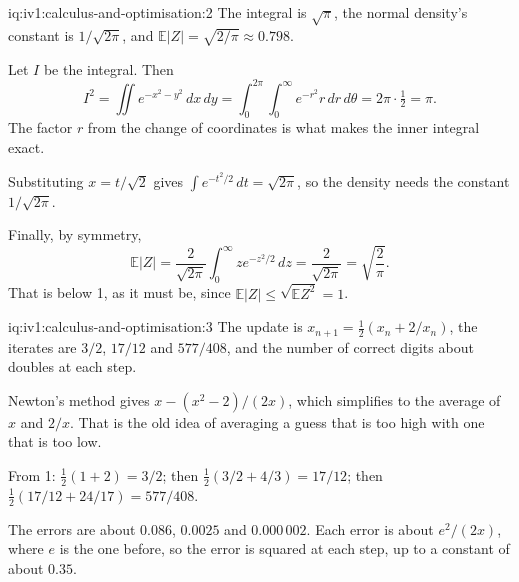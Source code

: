\begin{solution}{iq:iv1:calculus-and-optimisation:2}
The integral is $\sqrt{\pi}$, the normal density's constant is $1/\sqrt{2\pi}$, and $\mathbb{E}|Z| = \sqrt{2/\pi} \approx 0.798$.

Let $I$ be the integral. Then
\[
I^2 = \iint e^{-x^2 - y^2}\,dx\,dy = \int_0^{2\pi}\!\!\int_0^\infty e^{-r^2} r\,dr\,d\theta = 2\pi \cdot \tfrac12 = \pi.
\]
The factor $r$ from the change of coordinates is what makes the inner integral exact.

Substituting $x = t/\sqrt{2}$ gives $\int e^{-t^2/2}\,dt = \sqrt{2\pi}$, so the density needs the constant $1/\sqrt{2\pi}$.

Finally, by symmetry,
\[
\mathbb{E}|Z| = \frac{2}{\sqrt{2\pi}}\int_0^\infty z e^{-z^2/2}\,dz = \frac{2}{\sqrt{2\pi}} = \sqrt{\frac{2}{\pi}}.
\]
That is below 1, as it must be, since $\mathbb{E}|Z| \le \sqrt{\mathbb{E}Z^2} = 1$.



\end{solution}

\begin{solution}{iq:iv1:calculus-and-optimisation:3}
The update is $x_{n+1} = \frac12(x_n + 2/x_n)$, the iterates are $3/2$, $17/12$ and $577/408$, and the number of correct digits about doubles at each step.

Newton's method gives $x - (x^2 - 2)/(2x)$, which simplifies to the average of $x$ and $2/x$. That is the old idea of averaging a guess that is too high with one that is too low.

From 1: $\frac12(1 + 2) = 3/2$; then $\frac12(3/2 + 4/3) = 17/12$; then $\frac12(17/12 + 24/17) = 577/408$.

The errors are about $0.086$, $0.0025$ and $0.000\,002$. Each error is about $e^2/(2x)$, where $e$ is the one before, so the error is squared at each step, up to a constant of about $0.35$.



\end{solution}

